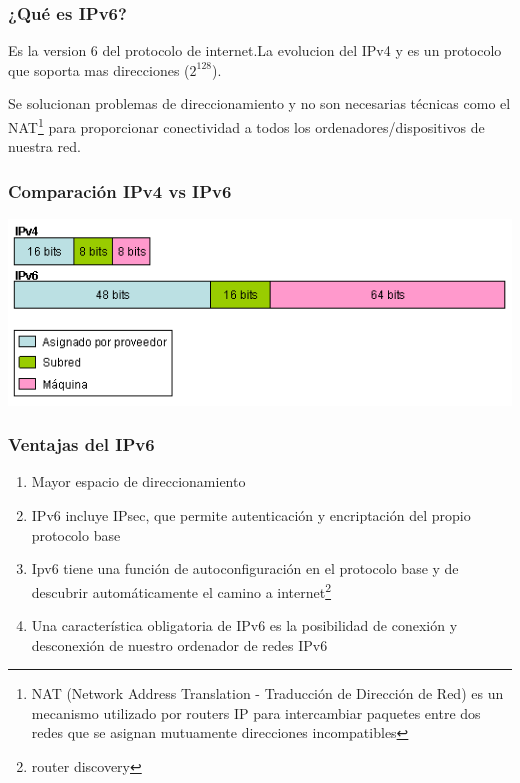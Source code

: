 \documentclass{beamer}
\begin{document}
\begin{frame}
\frametitle{¿Qué es IPv6?}

Es la version 6 del protocolo de internet.La evolucion del IPv4 y es un protocolo que soporta mas direcciones ($2^{128}$).\vspace{0.3cm}
\par Se solucionan problemas de direccionamiento y no son necesarias técnicas como el NAT\footnote[1]{NAT (Network Address Translation - Traducción de Dirección de Red) es un mecanismo utilizado por routers IP para intercambiar paquetes entre dos redes que se asignan mutuamente direcciones incompatibles} para proporcionar conectividad a todos los ordenadores/dispositivos de nuestra red.

\end{frame}

\begin{frame}
\frametitle{Comparación IPv4 vs IPv6}

\includegraphics[scale=0.87]{estructura_direccion.png}

\end{frame}


\begin{frame}
\frametitle{Ventajas del IPv6}

\begin{enumerate}[$*$]

	\item Mayor espacio de direccionamiento
	\item IPv6  incluye IPsec, que permite autenticación y encriptación del propio protocolo base
	\item Ipv6 tiene una función de autoconfiguración en el protocolo base y de descubrir automáticamente el camino a internet\footnote[1]{router discovery}
	\item Una característica obligatoria de IPv6 es la posibilidad de conexión y desconexión de nuestro ordenador de redes IPv6
\end{enumerate}
\end{frame}
\end{document}
